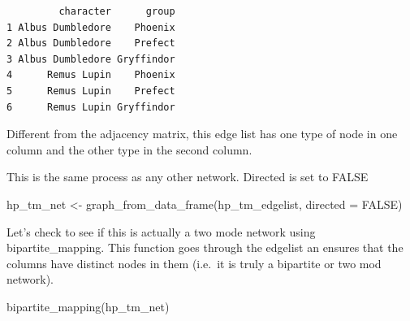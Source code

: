 \documentclass[
  letterpaper,
  DIV=11,
  numbers=noendperiod]{scrreprt}
\newenvironment{Shaded}{\begin{snugshade}}{\end{snugshade}}
\newcommand{\AttributeTok}[1]{\textcolor[rgb]{0.40,0.45,0.13}{#1}}
\newcommand{\ConstantTok}[1]{\textcolor[rgb]{0.56,0.35,0.01}{#1}}
\newcommand{\FunctionTok}[1]{\textcolor[rgb]{0.28,0.35,0.67}{#1}}
\newcommand{\NormalTok}[1]{\textcolor[rgb]{0.00,0.23,0.31}{#1}}
\newcommand{\OtherTok}[1]{\textcolor[rgb]{0.00,0.23,0.31}{#1}}
\begin{document}
\begin{verbatim}
         character      group
1 Albus Dumbledore    Phoenix
2 Albus Dumbledore    Prefect
3 Albus Dumbledore Gryffindor
4      Remus Lupin    Phoenix
5      Remus Lupin    Prefect
6      Remus Lupin Gryffindor
\end{verbatim}

Different from the adjacency matrix, this edge list has one type of node
in one column and the other type in the second column.

This is the same process as any other network. Directed is set to FALSE

\begin{Shaded}
\begin{Highlighting}[]
\NormalTok{hp\_tm\_net }\OtherTok{\textless{}{-}} \FunctionTok{graph\_from\_data\_frame}\NormalTok{(hp\_tm\_edgelist, }\AttributeTok{directed =} \ConstantTok{FALSE}\NormalTok{)}
\end{Highlighting}
\end{Shaded}

Let's check to see if this is actually a two mode network using
bipartite\_mapping. This function goes through the edgelist an ensures
that the columns have distinct nodes in them (i.e.~it is truly a
bipartite or two mod network).

\begin{Shaded}
\begin{Highlighting}[]
\FunctionTok{bipartite\_mapping}\NormalTok{(hp\_tm\_net)}
\end{Highlighting}
\end{Shaded}
\end{document}
